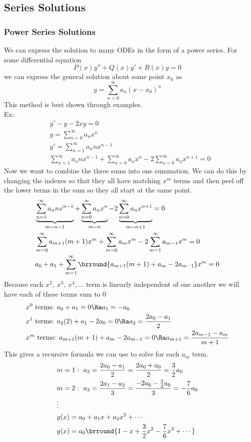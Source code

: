 \subsection{Series Solutions}
\subsubsection{Power Series Solutions}
We can express the solution to many ODEs in the form of a power series. For some differential equation
$$P(x)y''+Q(x)y'+R(x)y=0$$
we can express the general solution about some point $x_0$ as
$$y=\sum_{n=0}^\infty a_n(x-x_0)^n$$
This method is best shown through examples.\\
Ex:
\begin{align*}
    &y'-y-2xy=0\\
    &y=\sum_{n=0}^\infty a_nx^n\\
    &y'=\sum_{n=1}^\infty a_n nx^{n-1}\\
    &\sum_{n=1}^\infty a_nnx^{n-1}+\sum_{n=0}^\infty a_nx^n-2\sum_{n=0}^\infty a_nx^{n+1}=0
\end{align*}
Now we want to combine the three sums into one summation. We can do this by changing the indexes so that they all have matching $x^m$ terms and then peel off the lower terms in the sum so they all start at the same point.
\begin{align*}
    &\underbrace{\sum_{n=1}^\infty a_nnx^{n-1}}_{m=n-1}+\underbrace{\sum_{n=0}^\infty a_nx^n}_{m=n}-2\underbrace{\sum_{n=0}^\infty a_nx^{n+1}}_{m=n+1}=0\\
    &\sum_{m=0}^\infty a_{m+1}(m+1)x^m+\sum_{m=0}^\infty a_mx^m-2\sum_{m=1}^\infty a_{m-1}x^m=0\\
    &a_0+a_1+\sum_{m=1}^\infty\brround{a_{m+1}(m+1)+a_m-2a_{m-1}}x^m=0
\end{align*}
Because each $x^2,\ x^3,\ x^4,\ldots$ term is linearly independent of one another we will have each of these terms sum to 0
\begin{align*}
    &x^0\text{ terms: }a_0+a_1=0\Ra a_1=-a_0\\
    &x^1\text{ terms: }a_2(2)+a_1-2a_0=0\Ra a_2=\frac{2a_0-a_1}{2}\\
    &x^m\text{ terms: }a_{m+1}(m+1)+a_m-2a_{m-1}=0\Ra a_{m+1}=\frac{2a_{m-1}-a_m}{m+1}
\end{align*}
This gives a recursive formula we can use to solve for each $a_m$ term.
\begin{align*}
    &m=1:\ a_2=\frac{2a_0-a_1}{2}=\frac{2a_0+a_0}{2}=\frac{3}{2}a_0\\
    &m=2:\ a_3=\frac{2a_1-a_2}{3}=\frac{-2a_0-\frac{3}{2}a_0}{3}=-\frac{7}{6}a_0\\
    &\vdots\\
    &y(x)=a_0+a_1x+a_2x^2+\cdots\\
    &y(x)=a_0\brround{1-x+\frac{3}{2}x^2-\frac{7}{6}x^3+\cdots}
\end{align*}
